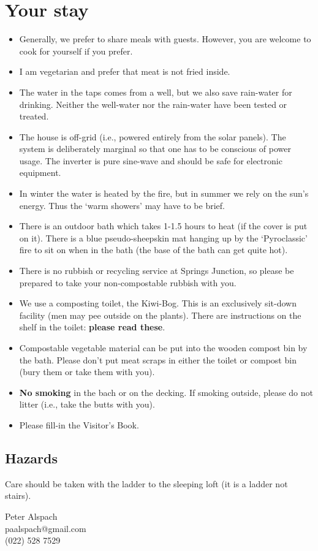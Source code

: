 \documentclass[12pt]{article} %
\begin{document}
\section{Your stay}
\begin{itemize}
  \item Generally, we prefer to share meals with guests.  However, you are welcome to cook for yourself if you prefer.
  \item I am vegetarian and prefer that meat is not fried inside.
  \item The water in the taps comes from a well, but we also save rain-water for drinking.  Neither the well-water nor the rain-water have been tested or treated.
  \item The house is off-grid (i.e., powered entirely from the solar panels).  The system is deliberately marginal so that one has to be conscious of power usage.  The inverter is pure sine-wave and should be safe for electronic equipment.
  \item In winter the water is heated by the fire, but in summer we rely on the sun's energy.  Thus the `warm showers' may have to be brief.
  \item There is an outdoor bath which takes 1-1.5 hours to heat (if the cover is put on it).  There is a blue pseudo-sheepskin mat hanging up by the `Pyroclassic' fire to sit on when in the bath (the base of the bath can get quite hot).
  \item There is no rubbish or recycling service at Springs Junction, so please be prepared to take your non-compostable rubbish with you.
  \item We use a composting toilet, the Kiwi-Bog.  This is an exclusively sit-down facility (men may pee outside on the plants).  There are instructions on the shelf in the toilet: \textbf{please read these}.
  \item Compostable vegetable material can be put into the wooden compost bin by the bath.  Please don't put meat scraps in either the toilet or compost bin (bury them or take them with you).
  \item \textbf{No smoking} in the bach or on the decking.  If smoking outside, please do not litter (i.e., take the butts with you).
  \item Please fill-in the Visitor's Book.
\end{itemize}

\subsection{Hazards}
Care should be taken with the ladder to the sleeping loft (it is a ladder not stairs).

\bigskip
Peter Alspach\\paalspach@gmail.com\\(022) 528 7529
\end{document}
